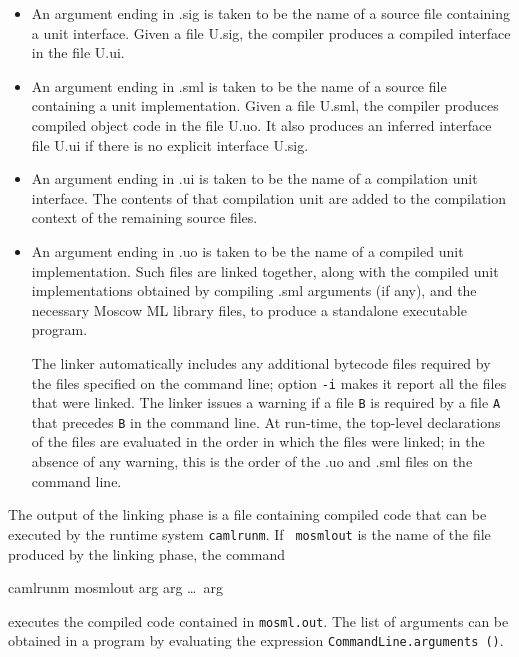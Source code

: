 \documentclass[fleqn,a4paper]{article}
\begin{document}
\begin{itemize}
\item An argument ending in .sig is taken to be the name of a source
  file containing a unit interface.  Given a file U.sig, the compiler
  produces a compiled interface in the file U.ui.
  
\item An argument ending in .sml is taken to be the name of a source
  file containing a unit implementation.  Given a file U.sml, the
  compiler produces compiled object code in the file U.uo.  It also
  produces an inferred interface file U.ui if there is no explicit
  interface U.sig.
  
\item An argument ending in .ui is taken to be the name of a
  compilation unit interface.  The contents of that compilation unit
  are added to the compilation context of the remaining source files.
  
\item An argument ending in .uo is taken to be the name of a compiled
  unit implementation.  Such files are linked together, along with the
  compiled unit implementations obtained by compiling .sml arguments
  (if any), and the necessary Moscow ML library files, to produce a
  standalone executable program.
  
  The linker automatically includes any additional bytecode files
  required by the files specified on the command line; option {\tt -i}
  makes it report all the files that were linked.  The linker issues a
  warning if a file {\tt B} is required by a file {\tt A} that
  precedes {\tt B} in the command line.  At run-time, the top-level
  declarations of the files are evaluated in the order in which the
  files were linked; in the absence of any warning, this is the order
  of the .uo and .sml files on the command line.
\end{itemize}

\noindent 
The output of the linking phase is a file containing compiled code
that can be executed by the runtime system {\tt camlrunm}.  If {\tt
  mosmlout} is the name of the file produced by the linking phase, the
command

\begin{program}
camlrunm mosmlout arg arg \ldots\ arg
\end{program}

\noindent executes the compiled code contained in {\tt mosml.out}.
The list of arguments can be obtained in a program by evaluating the
expression {\tt CommandLine.arguments ()}.
\end{document}
